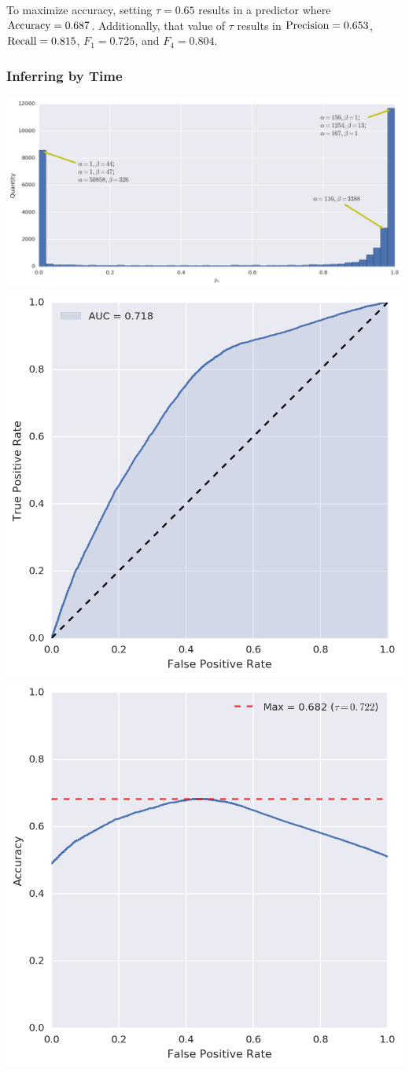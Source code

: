 To maximize accuracy, setting $\tau = 0.65$ results in a predictor where $\operatorname{Accuracy} = 0.687$. Additionally, that value of $\tau$ results in $\operatorname{Precision} = 0.653$, $\operatorname{Recall} = 0.815$, $F_1 = 0.725$, and $F_4 = 0.804$.

\newpage
\subsubsection{Inferring by Time}
\label{subsec:time_infer}

\begin{center}
\includegraphics[width=\textwidth]{figures/bayes/hist_time.png}
\includegraphics[width=.49\textwidth]{figures/bayes/roc_time.png}
\includegraphics[width=.49\textwidth]{figures/bayes/accuracy_time.png}
\end{center}

